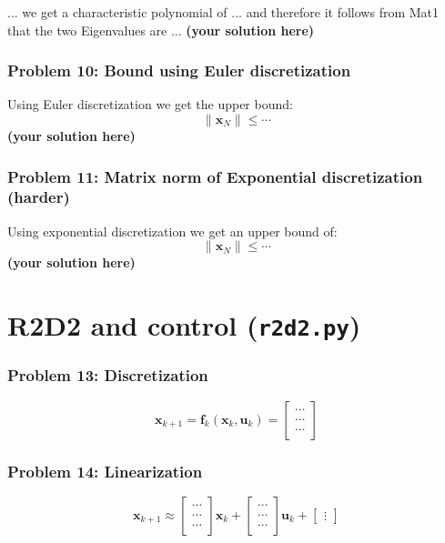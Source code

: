 \documentclass[12pt,twoside]{article}
\newcommand\redt[1]{ {\textcolor[rgb]{0.60, 0.00, 0.00}{\textbf{ #1} } } }
\newcommand{\m}[1]{\boldsymbol{ #1}}
\newcommand{\yoursolution}{ \redt{(your solution here) } }
\begin{document}
... we get a characteristic polynomial of ... and therefore it follows from Mat1 that the two Eigenvalues are ... 
\yoursolution

\subsubsection*{{\color{red}Problem 10:  Bound using Euler discretization}}

	Using Euler discretization we get the upper bound:
	$$
\| \m x_N \| \leq \cdots
$$
\yoursolution
	
\subsubsection*{{\color{red}Problem 11:  Matrix norm of Exponential discretization (harder)}}
	
Using exponential discretization we get an upper bound of:
		$$
		\| \m x_N \| \leq \cdots
		$$
		\yoursolution
	
\section{R2D2 and control (\texttt{r2d2.py})}
\subsubsection*{{\color{red}Problem 13:  Discretization}}

	$$
	\m x_{k+1} = \m f_k(\m x_k, \m u_k) = \begin{bmatrix} \cdots \\ \cdots \\ \cdots \end{bmatrix}$$

\subsubsection*{{\color{red}Problem 14:  Linearization}}
	
$$
		\m x_{k+1} \approx \begin{bmatrix} \cdots \\ \cdots \\ \cdots \end{bmatrix} \m x_k + 
		\begin{bmatrix} \cdots \\ \cdots \\ \cdots \end{bmatrix} \m u_k +  
		\begin{bmatrix} \vdots \end{bmatrix} 
$$
	
\end{document}
